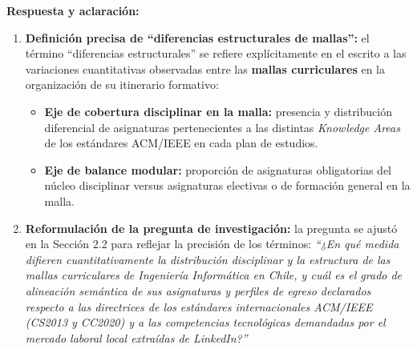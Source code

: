 \newpage

\noindent
{}

\vspace{0.2cm}

\noindent
\textbf{Respuesta y aclaración:}
\begin{enumerate}[leftmargin=*]
	\item \textbf{Definición precisa de ``diferencias estructurales de mallas'':} el término ``diferencias estructurales'' se refiere explícitamente en el escrito a las variaciones cuantitativas observadas entre las \textbf{mallas curriculares} en la organización de su itinerario formativo:
	      \begin{itemize}
		      \item \textbf{Eje de cobertura disciplinar en la malla:} presencia y distribución diferencial de asignaturas pertenecientes a las distintas \textit{Knowledge Areas} de los estándares ACM/IEEE en cada plan de estudios.
		      \item \textbf{Eje de balance modular:} proporción de asignaturas obligatorias del núcleo disciplinar versus asignaturas electivas o de formación general en la malla.
	      \end{itemize}
	\item \textbf{Reformulación de la pregunta de investigación:} la pregunta se ajustó en la Sección 2.2 para reflejar la precisión de los términos: \textit{“¿En qué medida difieren cuantitativamente la distribución disciplinar y la estructura de las mallas curriculares de Ingeniería Informática en Chile, y cuál es el grado de alineación semántica de sus asignaturas y perfiles de egreso declarados respecto a las directrices de los estándares internacionales ACM/IEEE (CS2013 y CC2020) y a las competencias tecnológicas demandadas por el mercado laboral local extraídas de LinkedIn?”}
\end{enumerate}

